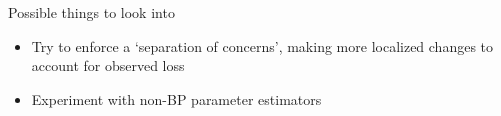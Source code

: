 

\begin{frame}{Possible things to look into}

\begin{itemize}
\item Try to enforce a `separation of concerns', making more localized changes to account for observed loss
  \vspace{0.5cm}
\item Experiment with non-BP parameter estimators
\end{itemize}

\end{frame}


